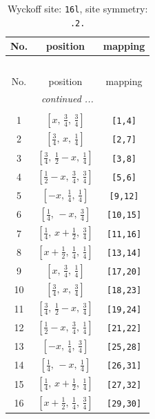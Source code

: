 \documentclass[fleqn,8pt]{jsarticle}
\begin{document}
\renewcommand{\arraystretch}{1.2}
\begin{longtable}{ccc}
\caption{Wyckoff site: {\tt 16l}, site symmetry: {\tt .2.}}
 \\
 \hline \hline
No. & position & mapping \\ \hline \endfirsthead

\multicolumn{2}{l}{\tablename\ \thetable{}} \\
 \hline \hline
No. & position & mapping \\ \hline \endhead

 \hline \hline
\multicolumn{2}{r}{\footnotesize\it continued ...} \\ \endfoot

 \hline \hline
\multicolumn{2}{r}{} \\ \endlastfoot

1 & $\left[ x,\, \frac{3}{4},\, \frac{3}{4} \right]$ & {\tt [1,4]} \\ \hline
2 & $\left[ \frac{3}{4},\, x,\, \frac{1}{4} \right]$ & {\tt [2,7]} \\ \hline
3 & $\left[ \frac{3}{4},\, \frac{1}{2} - x,\, \frac{1}{4} \right]$ & {\tt [3,8]} \\ \hline
4 & $\left[ \frac{1}{2} - x,\, \frac{3}{4},\, \frac{3}{4} \right]$ & {\tt [5,6]} \\ \hline
5 & $\left[ - x,\, \frac{1}{4},\, \frac{1}{4} \right]$ & {\tt [9,12]} \\ \hline
6 & $\left[ \frac{1}{4},\, - x,\, \frac{3}{4} \right]$ & {\tt [10,15]} \\ \hline
7 & $\left[ \frac{1}{4},\, x + \frac{1}{2},\, \frac{3}{4} \right]$ & {\tt [11,16]} \\ \hline
8 & $\left[ x + \frac{1}{2},\, \frac{1}{4},\, \frac{1}{4} \right]$ & {\tt [13,14]} \\ \hline
9 & $\left[ x,\, \frac{3}{4},\, \frac{1}{4} \right]$ & {\tt [17,20]} \\ \hline
10 & $\left[ \frac{3}{4},\, x,\, \frac{3}{4} \right]$ & {\tt [18,23]} \\ \hline
11 & $\left[ \frac{3}{4},\, \frac{1}{2} - x,\, \frac{3}{4} \right]$ & {\tt [19,24]} \\ \hline
12 & $\left[ \frac{1}{2} - x,\, \frac{3}{4},\, \frac{1}{4} \right]$ & {\tt [21,22]} \\ \hline
13 & $\left[ - x,\, \frac{1}{4},\, \frac{3}{4} \right]$ & {\tt [25,28]} \\ \hline
14 & $\left[ \frac{1}{4},\, - x,\, \frac{1}{4} \right]$ & {\tt [26,31]} \\ \hline
15 & $\left[ \frac{1}{4},\, x + \frac{1}{2},\, \frac{1}{4} \right]$ & {\tt [27,32]} \\ \hline
16 & $\left[ x + \frac{1}{2},\, \frac{1}{4},\, \frac{3}{4} \right]$ & {\tt [29,30]} \\
\end{longtable}
\end{document}
